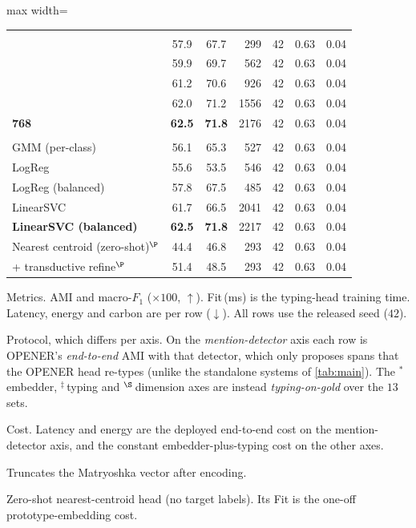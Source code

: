 \begin{table}[tp]
\begin{adjustbox}{max width=\textwidth}
\begin{threeparttable}
\begin{tabular}{lccrrrr}
\addlinespace
\multicolumn{7}{l}{\emph{Matryoshka dimension}$^\S$} \\
\quad 64                             & 57.9 & 67.7 & 299 & 42 & 0.63 & 0.04 \\
\quad 128                            & 59.9 & 69.7 & 562 & 42 & 0.63 & 0.04 \\
\quad 256                            & 61.2 & 70.6 & 926 & 42 & 0.63 & 0.04 \\
\quad 512                            & 62.0 & 71.2 & 1556 & 42 & 0.63 & 0.04 \\
\quad \textbf{768}                   & \textbf{62.5} & \textbf{71.8} & 2176 & 42 & 0.63 & 0.04 \\
\addlinespace
\multicolumn{7}{l}{\emph{Entity typing}$^\ddagger$} \\
\quad GMM (per-class)                & 56.1 & 65.3 & 527 & 42 & 0.63 & 0.04 \\
\quad LogReg                         & 55.6 & 53.5 & 546 & 42 & 0.63 & 0.04 \\
\quad LogReg (balanced)              & 57.8 & 67.5 & 485 & 42 & 0.63 & 0.04 \\
\quad LinearSVC                      & 61.7 & 66.5 & 2041 & 42 & 0.63 & 0.04 \\
\quad \textbf{LinearSVC (balanced)}  & \textbf{62.5} & \textbf{71.8} & 2217 & 42 & 0.63 & 0.04 \\
\quad Nearest centroid (zero-shot)$^\P$ & 44.4 & 46.8 & 293 & 42 & 0.63 & 0.04 \\
\quad \quad + transductive refine$^\P$ & 51.4 & 48.5 & 293 & 42 & 0.63 & 0.04 \\
\bottomrule
\end{tabular}
\begin{tablenotes}[flushleft]
\footnotesize
\item[] Metrics. AMI and macro-$F_1$ ($\times100$, $\uparrow$). Fit\,(ms) is the typing-head training time. Latency, energy and carbon are per row ($\downarrow$). All rows use the released seed ($42$).
\item[] Protocol, which differs per axis. On the \emph{mention-detector} axis each row is OPENER's \emph{end-to-end} AMI with that detector, which only proposes spans that the OPENER head re-types (unlike the standalone systems of \autoref{tab:main}). The $^\ast$\,embedder, $^\ddagger$\,typing and $^\S$\,dimension axes are instead \emph{typing-on-gold} over the $13$ sets.
\item[] Cost. Latency and energy are the deployed end-to-end cost on the mention-detector axis, and the constant embedder-plus-typing cost on the other axes.
\item[$\S$] Truncates the Matryoshka vector after encoding.
\item[$\P$] Zero-shot nearest-centroid head (no target labels). Its Fit is the one-off prototype-embedding cost.
\end{tablenotes}
\end{threeparttable}
\end{adjustbox}
\end{table}

